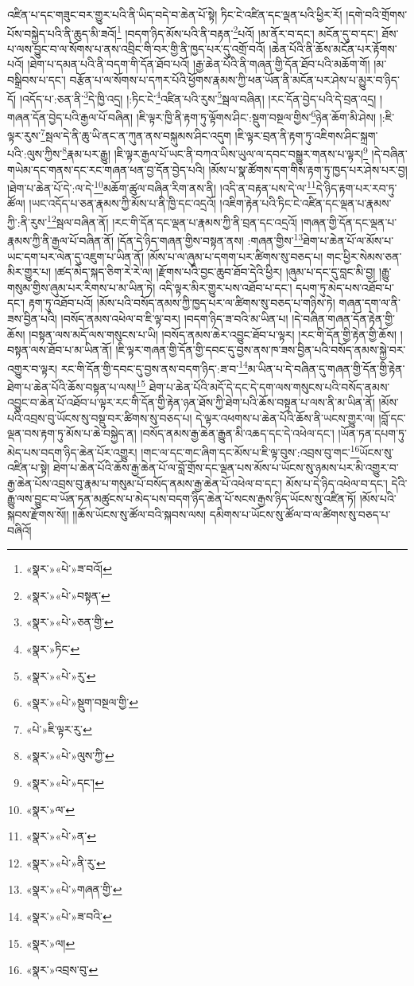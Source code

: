 འཛིན་པ་དང་གཟུང་བར་གྱུར་པའི་ནི་ཡིད་བདེ་བ་ཆེན་པོ་སྟེ། ཏིང་ངེ་འཛིན་དང་ལྡན་པའི་ཕྱིར་རོ། །དགེ་བའི་གྲོགས་པོས་བསྐྱེད་པའི་ནི་ཆུད་མི་ཟའོ།\footnote{«སྣར་»«པེ་»ཟ་བའོ།} །བདག་ཉིད་མོས་པའི་ནི་བརྟན་\footnote{«སྣར་»«པེ་»བསྟན་}པའོ། །མ་ནོར་བ་དང་། མངོན་དུ་བ་དང་། ཐོས་པ་ལས་བྱུང་བ་ལ་སོགས་པ་ནས་འབྲིང་གི་བར་གྱི་ནི་ཁྱད་པར་དུ་འགྲོ་བའོ། །ཆེན་པོའི་ནི་ཆོས་མངོན་པར་རྟོགས་པའོ། །ཐེག་པ་དམན་པའི་ནི་བདག་གི་དོན་ཐོབ་པའོ། །རྒྱ་ཆེན་པོའི་ནི་གཞན་གྱི་དོན་ཐོབ་པའི་མཆོག་གོ། །མ་བསྒྲིབས་པ་དང་། བརྩོན་པ་ལ་སོགས་པ་དཀར་པོའི་ཕྱོགས་རྣམས་ཀྱི་ཕན་ཡོན་ནི་མངོན་པར་ཤེས་པ་མྱུར་བ་ཉིད་དོ། །འདོད་པ་:ཅན་ནི་\footnote{«སྣར་»«པེ་»ཅན་གྱི་}དེ་ཁྱི་འདྲ། །:ཏིང་ངེ་\footnote{«སྣར་»ཏིང་}འཛིན་པའི་རུས་\footnote{«སྣར་»«པེ་»རུ་}སྦལ་བཞིན། །རང་དོན་བྱེད་པའི་དེ་བྲན་འདྲ། །གཞན་དོན་བྱེད་པའི་རྒྱལ་པོ་བཞིན། །ཇི་ལྟར་ཁྱི་ནི་རྟག་ཏུ་ལྟོགས་ཤིང་:སྡུག་བསྔལ་གྱིས་\footnote{«སྣར་»«པེ་»སྡུག་བསྔལ་གྱི་}ཉེན་ཆོག་མི་ཤེས། །:ཇི་ལྟར་རུས་\footnote{«པེ་»ཇི་ལྟར་རུ་}སྦལ་དེ་ནི་ཆུ་ཡི་ནང་ན་ཀུན་ནས་བསྐུམས་ཤིང་འདུག །ཇི་ལྟར་བྲན་ནི་རྟག་ཏུ་འཇིགས་ཤིང་སྐྲག་པའི་:ལུས་ཀྱིས་\footnote{«སྣར་»«པེ་»ལུས་ཀྱི་}རྣམ་པར་རྒྱུ། །ཇི་ལྟར་རྒྱལ་པོ་ཡང་ནི་བཀའ་ཡིས་ཡུལ་ལ་དབང་བསྒྱུར་གནས་པ་ལྟར།\footnote{«སྣར་»«པེ་»དང་།} །དེ་བཞིན་གཡེམ་དང་གནས་དང་རང་གཞན་ཕན་བྱ་དོན་བྱེད་པའི། །མོས་པ་སྣ་ཚོགས་དག་གིས་རྟག་ཏུ་ཁྱད་པར་ཤེས་པར་བྱ། །ཐེག་པ་ཆེན་པོ་དེ་:ལ་དེ་\footnote{«སྣར་»ལ་}མཆོག་ཚུལ་བཞིན་རིག་ནས་ནི། །འདི་ན་བརྟན་པས་དེ་ལ་\footnote{«སྣར་»«པེ་»ན་}དེ་ཉིད་རྟག་པར་རབ་ཏུ་ཚོལ། །ཡང་འདོད་པ་ཅན་རྣམས་ཀྱི་མོས་པ་ནི་ཁྱི་དང་འདྲའོ། །འཇིག་རྟེན་པའི་ཏིང་ངེ་འཛིན་དང་ལྡན་པ་རྣམས་ཀྱི་:ནི་རུས་\footnote{«སྣར་»«པེ་»ནི་རུ་}སྦལ་བཞིན་ནོ། །རང་གི་དོན་དང་ལྡན་པ་རྣམས་ཀྱི་ནི་བྲན་དང་འདྲའོ། །གཞན་གྱི་དོན་དང་ལྡན་པ་རྣམས་ཀྱི་ནི་རྒྱལ་པོ་བཞིན་ནོ། །དོན་དེ་ཉིད་གཞན་གྱིས་བསྟན་ནས། :གཞན་གྱིས་\footnote{«སྣར་»«པེ་»གཞན་གྱི་}ཐེག་པ་ཆེན་པོ་ལ་མོས་པ་ཡང་དག་པར་ལེན་དུ་འཇུག་པ་ཡིན་ནོ། །མོས་པ་ལ་ཞུམ་པ་དགག་པར་ཚིགས་སུ་བཅད་པ། གང་ཕྱིར་སེམས་ཅན་མིར་གྱུར་པ། །ཚད་མེད་སྐད་ཅིག་རེ་རེ་ལ། །རྫོགས་པའི་བྱང་ཆུབ་ཐོབ་དེའི་ཕྱིར། །ཞུམ་པ་དང་དུ་བླང་མི་བྱ། །རྒྱུ་གསུམ་གྱིས་ཞུམ་པར་རིགས་པ་མ་ཡིན་ཏེ། འདི་ལྟར་མིར་གྱུར་པས་འཐོབ་པ་དང་། དཔག་ཏུ་མེད་པས་འཐོབ་པ་དང་། རྟག་ཏུ་འཐོབ་པའོ། །མོས་པའི་བསོད་ནམས་ཀྱི་ཁྱད་པར་ལ་ཚིགས་སུ་བཅད་པ་གཉིས་ཏེ། གཞན་དག་ལ་ནི་ཟས་བྱིན་པའི། །བསོད་ནམས་འཕེལ་བ་ཇི་ལྟ་བར། །བདག་ཉིད་ཟ་བའི་མ་ཡིན་པ། །དེ་བཞིན་གཞན་དོན་རྟེན་གྱི་ཆོས། །བསྟན་ལས་མདོ་ལས་གསུངས་པ་ཡི། །བསོད་ནམས་ཆེར་འབྱུང་ཐོབ་པ་ལྟར། །རང་གི་དོན་གྱི་རྟེན་གྱི་ཆོས། །བསྟན་ལས་ཐོབ་པ་མ་ཡིན་ནོ། །ཇི་ལྟར་གཞན་གྱི་དོན་གྱི་དབང་དུ་བྱས་ནས་ཁ་ཟས་བྱིན་པའི་བསོད་ནམས་སྐྱེ་བར་འགྱུར་བ་ལྟར། རང་གི་དོན་གྱི་དབང་དུ་བྱས་ནས་བདག་ཉིད་:ཟ་བ་\footnote{«སྣར་»«པེ་»ཟ་བའི་}མ་ཡིན་པ་དེ་བཞིན་དུ་གཞན་གྱི་དོན་གྱི་རྟེན་ཐེག་པ་ཆེན་པོའི་ཆོས་བསྟན་པ་ལས།\footnote{«སྣར་»ལ།} ཐེག་པ་ཆེན་པོའི་མདོ་དེ་དང་དེ་དག་ལས་གསུངས་པའི་བསོད་ནམས་འབྱུང་བ་ཆེན་པོ་འཐོབ་པ་ལྟར་རང་གི་དོན་གྱི་རྟེན་ཉན་ཐོས་ཀྱི་ཐེག་པའི་ཆོས་བསྟན་པ་ལས་ནི་མ་ཡིན་ནོ། །མོས་པའི་འབྲས་བུ་ཡོངས་སུ་བསྡུ་བར་ཚིགས་སུ་བཅད་པ། དེ་ལྟར་འཕགས་པ་ཆེན་པོའི་ཆོས་ནི་ཡངས་གྱུར་ལ། །བློ་དང་ལྡན་བས་རྟག་ཏུ་མོས་པ་ཆེ་བསྐྱེད་ན། །བསོད་ནམས་རྒྱ་ཆེན་རྒྱུན་མི་འཆད་དང་དེ་འཕེལ་དང་། །ཡོན་ཏན་དཔག་ཏུ་མེད་པས་བདག་ཉིད་ཆེན་པོར་འགྱུར། །གང་ལ་དང་གང་ཞིག་དང་མོས་པ་ཇི་ལྟ་བུས་:འབྲས་བུ་གང་\footnote{«སྣར་»འབྲས་བུ་}ཡོངས་སུ་འཛིན་པ་སྟེ། ཐེག་པ་ཆེན་པོའི་ཆོས་རྒྱ་ཆེན་པོ་ལ་བློ་གྲོས་དང་ལྡན་པས་མོས་པ་ཡོངས་སུ་ཉམས་པར་མི་འགྱུར་བ་རྒྱ་ཆེན་པོས་འབྲས་བུ་རྣམ་པ་གསུམ་པོ་བསོད་ནམས་རྒྱ་ཆེན་པོ་འཕེལ་བ་དང་། མོས་པ་དེ་ཉིད་འཕེལ་བ་དང་། དེའི་རྒྱུ་ལས་བྱུང་བ་ཡོན་ཏན་མཚུངས་པ་མེད་པས་བདག་ཉིད་ཆེན་པོ་སངས་རྒྱས་ཉིད་ཡོངས་སུ་འཛིན་ཏོ། །མོས་པའི་སྐབས་རྫོགས་སོ།། །།ཆོས་ཡོངས་སུ་ཚོལ་བའི་སྐབས་ལས། དམིགས་པ་ཡོངས་སུ་ཚོལ་བ་ལ་ཚིགས་སུ་བཅད་པ་བཞིའོ། 